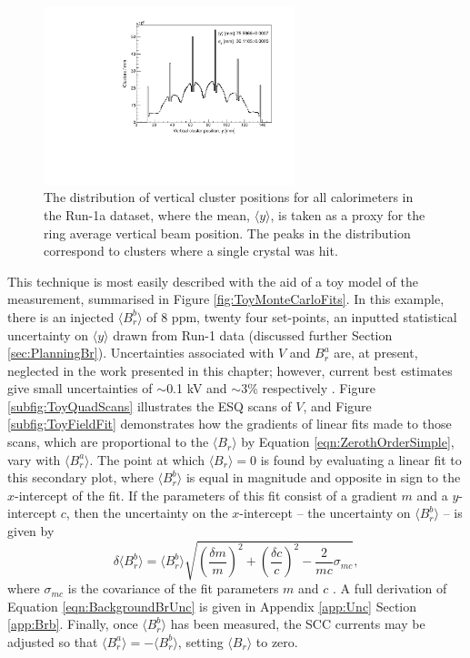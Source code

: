 \begin{figure}[t!]
\centering{}
\includegraphics[trim={0 0 0 0},clip,width=0.65\textwidth]{Images/Chapter4/CaloAvgYPlot.pdf}
\caption{The distribution of vertical cluster positions for all calorimeters in the Run-1a dataset, where the mean, $\langle y \rangle$, is taken as a proxy for the ring average vertical beam position. The peaks in the distribution correspond to clusters where a single crystal was hit.}
\label{fig:CaloAvgYPlot}
\end{figure}

This technique is most easily described with the aid of a toy model of the measurement, summarised in Figure \ref{fig:ToyMonteCarloFits}. In this example, there is an injected $\langle B_{r}^{b}\rangle$ of 8 ppm, twenty four set-points, an inputted statistical uncertainty on $\langle y \rangle$ drawn from Run-1 data (discussed further Section \ref{sec:PlanningBr}). Uncertainties associated with $V$ and $B_{r}^{a}$ are, at present, neglected in the work presented in this chapter; however, current best estimates give small uncertainties of $\sim$0.1 kV and $\sim$3\% respectively \cite{VoltageError}\cite{SimonRadialFieldTalk}. Figure \ref{subfig:ToyQuadScans} illustrates the ESQ scans of $V$, and Figure \ref{subfig:ToyFieldFit} demonstrates how the gradients of linear fits made to those scans, which are proportional to the $\langle B_{r} \rangle$ by Equation \ref{eqn:ZerothOrderSimple}, vary with $\langle B_{r}^{a} \rangle$. The point at which $\langle B_{r} \rangle = 0$ is found by evaluating a linear fit to this secondary plot, where $\langle B_{r}^{b} \rangle$ is equal in magnitude and opposite in sign to the $x$-intercept of the fit. If the parameters of this fit consist of a gradient $m$ and a $y$-intercept $c$, then the uncertainty on the $x$-intercept -- the uncertainty on $\langle B_{r}^{b} \rangle$ -- is given by 
%
\begin{equation}
  \delta \langle B_{r}^{b} \rangle = \langle B_{r}^{b} \rangle \sqrt{ \left(\frac{\delta m}{m}\right)^{2} + \left(\frac{\delta c}{c}\right)^{2} - \frac{2}{mc}\sigma_{mc} },
\label{eqn:BackgroundBrUnc}
\end{equation}
%
where $\sigma_{mc}$ is the covariance of the fit parameters $m$ and $c$ \cite{Taylor}. A full derivation of Equation \ref{eqn:BackgroundBrUnc} is given in Appendix \ref{app:Unc} Section \ref{app:Brb}. Finally, once $\langle B_{r}^{b} \rangle$ has been measured, the SCC currents may be adjusted so that $\langle B_{r}^{a} \rangle = - \langle B_{r}^{b} \rangle$, setting $\langle B_{r} \rangle$ to zero. 

